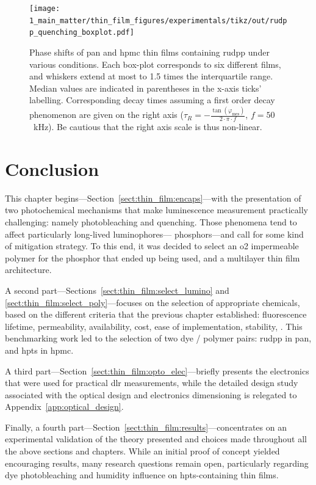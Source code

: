\begin{figure}
	\centering
	\texttt{[image: 1\_main\_matter/thin\_film\_figures/experimentals/tikz/out/rudpp\_quenching\_boxplot.pdf]}
	\caption[Box-plot of \gls{rudpp} phosphorescence quenching in different conditions.]{Phase shifts of \gls{pan} and \gls{hpmc} thin films containing \gls{rudpp} under various conditions. Each box-plot corresponds to six different films, and whiskers extend at most to 1.5 times the interquartile range. Median values are indicated in parentheses in the x-axis ticks' labelling. Corresponding decay times assuming a first order decay phenomenon are given on the right axis ($\tau_\textit{R}=-\frac{\tan(\varphi_\text{mes})}{2\cdot\pi\cdot f}$, $f=50$~kHz). Be cautious that the right axis scale is thus non-linear.}
	\label{fig:thin_film:experimental:rudpp_quenching_boxplot}
\end{figure}

\section{Conclusion}\label{sect:thin_film:conclusion}

This chapter begins---Section~\ref{sect:thin_film:encaps}---with the presentation of two photochemical mechanisms that make luminescence measurement practically challenging: namely photobleaching and quenching. Those phenomena tend to affect particularly long-lived luminophores---\ie{} phosphors---and call for some kind of mitigation strategy. To this end, it was decided to select an \gls{o2} impermeable polymer for the phosphor that ended up being used, and a multilayer thin film architecture.

A second part---Sections~\ref{sect:thin_film:select_lumino} and \ref{sect:thin_film:select_poly}---focuses on the selection of appropriate chemicals, based on the different criteria that the previous chapter established: fluorescence lifetime, permeability, availability, cost, ease of implementation, stability, \etc{}. This benchmarking work led to the selection of two dye / polymer pairs: \gls{rudpp} in \gls{pan}, and \gls{hpts} in \gls{hpmc}.

A third part---Section~\ref{sect:thin_film:opto_elec}---briefly presents the electronics that were used for practical \gls{dlr} measurements, while the detailed design study associated with the optical design and electronics dimensioning is relegated to Appendix~\ref{app:optical_design}.

Finally, a fourth part---Section~\ref{sect:thin_film:results}---concentrates on an experimental validation of the theory presented and choices made throughout all the above sections and chapters. While an initial proof of concept yielded encouraging results, many research questions remain open, particularly regarding dye photobleaching and humidity influence on \gls{hpts}-containing thin films.

